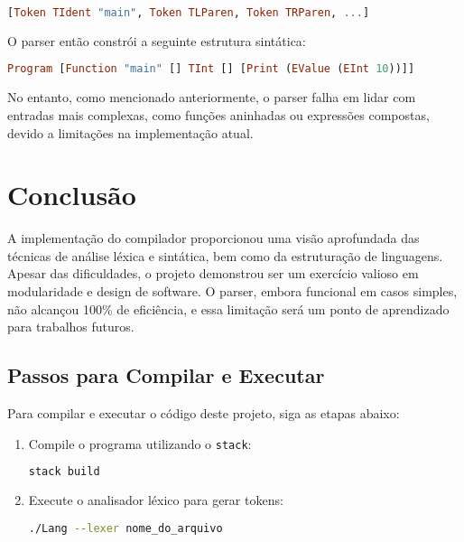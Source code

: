 \documentclass[a4paper,12pt]{article}
\begin{document}
\begin{lstlisting}[language=Haskell]
[Token TIdent "main", Token TLParen, Token TRParen, ...]
\end{lstlisting}

O parser então constrói a seguinte estrutura sintática:

\begin{lstlisting}[language=Haskell]
Program [Function "main" [] TInt [] [Print (EValue (EInt 10))]]
\end{lstlisting}

No entanto, como mencionado anteriormente, o parser falha em lidar com entradas mais complexas, como funções aninhadas ou expressões compostas, devido a limitações na implementação atual.

\section{Conclusão}

A implementação do compilador proporcionou uma visão aprofundada das técnicas de análise léxica e sintática, bem como da estruturação de linguagens. Apesar das dificuldades, o projeto demonstrou ser um exercício valioso em modularidade e design de software. O parser, embora funcional em casos simples, não alcançou 100\% de eficiência, e essa limitação será um ponto de aprendizado para trabalhos futuros.

\subsection*{Passos para Compilar e Executar}
Para compilar e executar o código deste projeto, siga as etapas abaixo:

\begin{enumerate}
    \item Compile o programa utilizando o \texttt{stack}:
    \begin{lstlisting}[language=bash]
    stack build
    \end{lstlisting}

    \item Execute o analisador léxico para gerar tokens:
    \begin{lstlisting}[language=bash]
    ./Lang --lexer nome_do_arquivo
    \end{lstlisting}
\end{enumerate}
\end{document}
